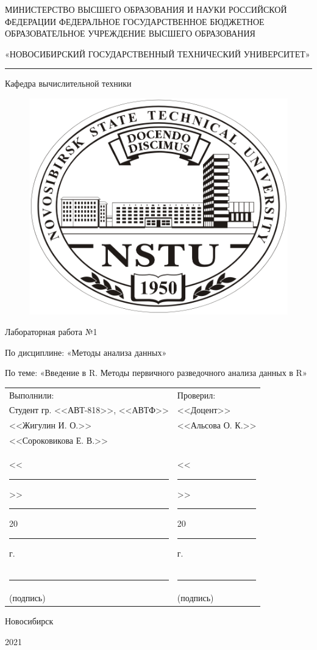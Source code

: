 \thispagestyle{empty}
\begin{center}

МИНИСТЕРСТВО ВЫСШЕГО ОБРАЗОВАНИЯ И НАУКИ РОССИЙСКОЙ ФЕДЕРАЦИИ
ФЕДЕРАЛЬНОЕ ГОСУДАРСТВЕННОЕ БЮДЖЕТНОЕ
ОБРАЗОВАТЕЛЬНОЕ УЧРЕЖДЕНИЕ
ВЫСШЕГО ОБРАЗОВАНИЯ

«НОВОСИБИРСКИЙ ГОСУДАРСТВЕННЫЙ ТЕХНИЧЕСКИЙ УНИВЕРСИТЕТ»

\noindent\rule{\textwidth}{0.4pt}

Кафедра вычислительной техники

\begin{figure}[H]
	\centering
	\includegraphics{title/logo.jpeg}
\end{figure}

Лабораторная работа №1

По дисциплине: «Методы анализа данных»

По теме: «Введение в R. Методы первичного разведочного анализа данных в R»

\end{center}

\noindent\begin{tabular}{p{}p{}}
	Выполнили: & Проверил: \\
	Студент гр. <<АВТ-818>>, <<АВТФ>> & <<Доцент>>\\
	<<Жигулин И. О.>> & <<Альсова О. К.>> \\
	<<Сороковикова Е. В.>> & \\
	<<\rule{1.5em}{0.4pt}>> \rule{5em}{0.4pt} 20\rule{1.5em}{0.4pt}г. & <<\rule{1.5em}{0.4pt}>> \rule{5em}{0.4pt} 20\rule{1.5em}{0.4pt}г.\\
	\rule{7.5em}{0.4pt} & \rule{7.5em}{0.4pt} \\
	\hspace{1.5em}(подпись) & \hspace{1.5em}(подпись)
\end{tabular}


\begin{center}

\vspace{2.3cm}

Новосибирск

2021
\end{center}

